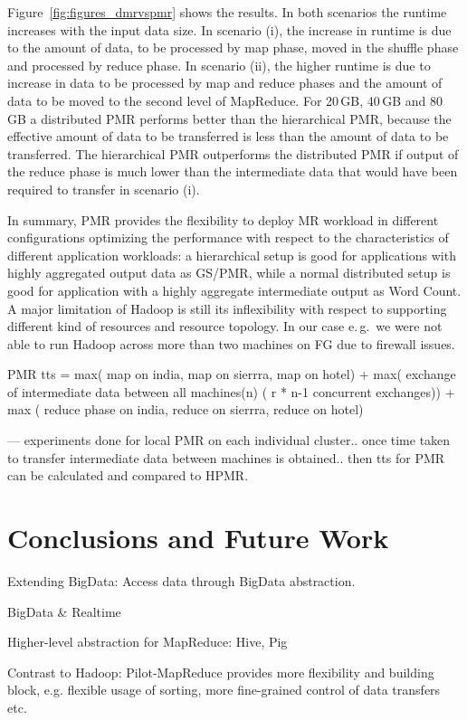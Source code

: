 \documentclass{acm_proc_article-sp}
\begin{document}
Figure~\ref{fig:figures_dmrvspmr} shows the results. In both scenarios the
runtime increases with the input data size. In scenario (i), the increase in
runtime is due to the amount of data, to be processed by map phase, moved in
the shuffle phase and processed by reduce phase. In scenario (ii), the higher
runtime is due to increase in data to be processed by map and reduce phases
and the amount of data to be moved to the second level of MapReduce. For
20\,GB, 40\,GB and 80\,GB a distributed PMR performs better than the
hierarchical PMR, because the effective amount of data to be transferred is
less than the amount of data to be transferred. The hierarchical PMR 
outperforms the distributed PMR if output of the reduce phase is much lower 
than the intermediate data that would have been required to transfer in 
scenario (i).

In summary, PMR provides the flexibility to deploy MR workload in different
configurations optimizing the performance with respect to the characteristics
of different application workloads: a hierarchical setup is good for
applications with highly aggregated output data as GS/PMR, while a normal
distributed setup is good for application with a highly aggregate intermediate
output as Word Count. A major limitation of Hadoop is still its inflexibility
with respect to supporting different kind of resources and resource topology.
In our case e.\,g.\ we were not able to run Hadoop across more than two
machines on FG due to firewall issues.


PMR tts = max( map  on india, map on  sierrra, map on hotel) + max( exchange of intermediate data between all machines(n) ( r * n-1 concurrent exchanges)) + max ( reduce phase on  india, reduce on  sierrra, reduce on hotel)

--- experiments done for local PMR on each individual cluster.. once time 
taken to transfer intermediate data between machines is obtained.. then tts 
for PMR can be calculated and compared to HPMR.


\section{Conclusions and Future Work}


Extending BigData: Access data through BigData abstraction.

BigData \& Realtime

Higher-level abstraction for MapReduce: Hive, Pig


Contrast to Hadoop:
Pilot-MapReduce provides more flexibility and building block, e.g. flexible 
usage of sorting, more fine-grained control of data transfers etc.
\end{document}
